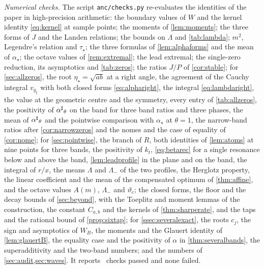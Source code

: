 \emph{Numerical checks.} The script \texttt{anc/checks.py} re-evaluates the
identities of the paper in high-precision arithmetic: the boundary values
of $W$ and the kernel identity \eqref{eq:kernel} at sample points; the
moments of \cref{lem:moments}; the three forms of $J$ and the Landen
relations; the bounds on $\Lambda$ and \cref{tab:lambda}; $m^2$, Legendre's
relation and $\tau_\star$; the three formulas of \cref{lem:alphaforms} and the
mean of $\alpha_\star$; the octave values of \cref{rem:extremal}; the lead
extremal; the single-zero reduction, its asymptotics and \cref{tab:zeros};
the ratios $J/P$ of \cref{cor:stable}; for \cref{sec:allzeros}, the root
$\eta_\star=\sqrt{ab}$ at a right angle, the agreement of the Cauchy integral
$v_{g_\sharp}$ with both closed forms \eqref{eq:alpharight}, the integral
\eqref{eq:lambdaright}, the value at the geometric centre and the symmetry,
every entry of \cref{tab:allzeros}, the positivity of ${\alpha^{\sharp}}_\theta$ on the band for
three band ratios and three phases, the mean of ${\alpha^{\sharp}}_\theta$ and the pointwise
comparison with $\alpha_\star$ at $\theta=1$, the narrow-band ratios after
\cref{cor:narrowzeros} and the nomes and the case of equality of
\cref{cor:nome}; for \cref{sec:pointwise}, the branch of $R$, both
identities of \cref{lem:atoms} at nine points for three bands, the
positivity of $k_t$, \eqref{eq:betarec} for a single resonance below and
above the band, \cref{lem:leadprofile} in the plane and on the band, the
integral of $r/x$, the means $\Lambda$ and $\Lambda_-$ of the two profiles,
the Herglotz property, the linear coefficient and the mean of the
compensated optimum of \cref{thm:affine}, and the octave values $A(m)$,
$\Lambda_-$ and $\vartheta_c$; the closed forms, the floor and the
decay bounds of \cref{sec:beyond}, with the Toeplitz and moment lemmas of the
construction, the constant $C_{a,b}$ and the kernels of
\cref{thm:sharperate}, and the taps and the rational bound of
\cref{prop:sixtap}; for \cref{ssec:severalexact}, the roots $c_j$, the sign and asymptotics of $W_B$, the moments and the Glauert identity of \cref{lem:glauertB}, the equality case and the positivity of $\alpha$ in \cref{thm:severalbands}, the superadditivity and the two-band numbers; and the numbers of \cref{sec:audit,sec:waves}. It reports
\checkscount\ checks passed and none failed.

